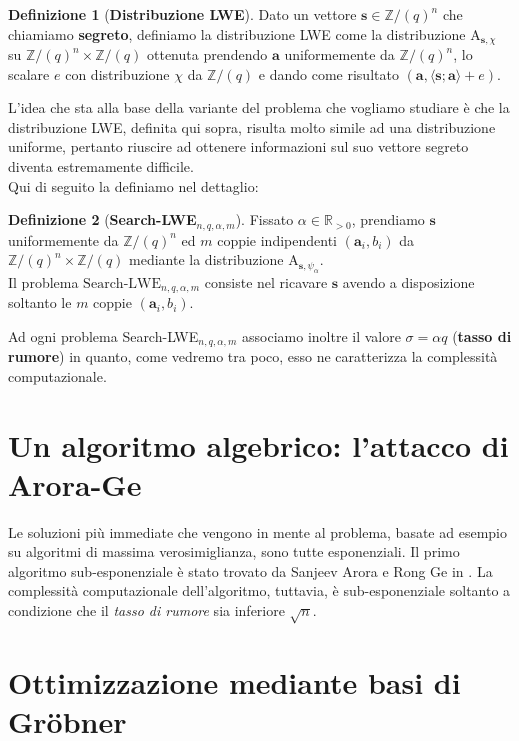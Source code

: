 \documentclass[a4paper]{article}
\theoremstyle{plain}
\theoremstyle{definition}
\newtheorem{definizione}{Definizione}[section]
\theoremstyle{remark}
\newcommand{\Z}{\mathbb{Z}}
\newcommand{\R}{\mathbb{R}}
\begin{document}
	\begin{definizione}[\textbf{Distribuzione LWE}]
			Dato un vettore $\bm{s}\in {\Z/(q)}^n$ che chiamiamo \textbf{segreto}, definiamo la distribuzione LWE come la distribuzione $\mathrm{A}_{\bm{s},\chi}$ su ${\Z/(q)}^n \times \Z/(q)$ ottenuta prendendo $\bm{a}$ uniformemente da ${\Z/(q)}^n$, lo scalare $e$ con distribuzione $\chi$ da $\Z/(q)$ e dando come risultato $(\bm{a},\langle \bm{s}; \bm{a}\rangle + e)$.\\
	\end{definizione}
	
	L'idea che sta alla base della variante del problema che vogliamo studiare è che la distribuzione LWE, definita qui sopra, risulta molto simile ad una distribuzione uniforme, pertanto riuscire ad ottenere informazioni sul suo vettore segreto diventa estremamente difficile.\\
	Qui di seguito la definiamo nel dettaglio: 
	
	\begin{definizione}[\textbf{Search-LWE}$_{n,q,\alpha,m}$]
		Fissato $\alpha \in \R_{>0}$, prendiamo $\textbf{s}$ uniformemente da ${\Z/(q)}^n$ ed $m$ coppie indipendenti $(\bm{a}_i,b_i)$ da ${\Z/(q)}^n \times \Z/(q)$ mediante la distribuzione $\mathrm{A}_{\textbf{s},\psi_\alpha}$. \\Il problema $\mathrm{Search}$-$\mathrm{LWE}_{n,q,\alpha,m}$ consiste nel ricavare $\textbf{s}$ avendo a disposizione soltanto le $m$ coppie $(\bm{a}_i,b_i)$.
	\end{definizione} 
	
	Ad ogni problema Search-LWE$_{n,q,\alpha,m}$ associamo inoltre il valore $\sigma=\alpha q$ (\textbf{tasso di rumore}) in quanto, come vedremo tra poco, esso ne caratterizza la complessità computazionale.
	
	\section{Un algoritmo algebrico: l'attacco di Arora-Ge}
	Le soluzioni più immediate che vengono in mente al problema, basate ad esempio su algoritmi di massima verosimiglianza, sono tutte esponenziali. Il primo algoritmo sub-esponenziale è stato trovato da Sanjeev Arora e Rong Ge in \cite{AroraGe}. La complessità computazionale dell'algoritmo, tuttavia, è sub-esponenziale soltanto a condizione che il \textit{tasso di rumore} sia inferiore $\sqrt{n}$.
	
	\section{Ottimizzazione mediante basi di Gröbner}
	~
	
	\newpage
	\printbibliography
\end{document}
